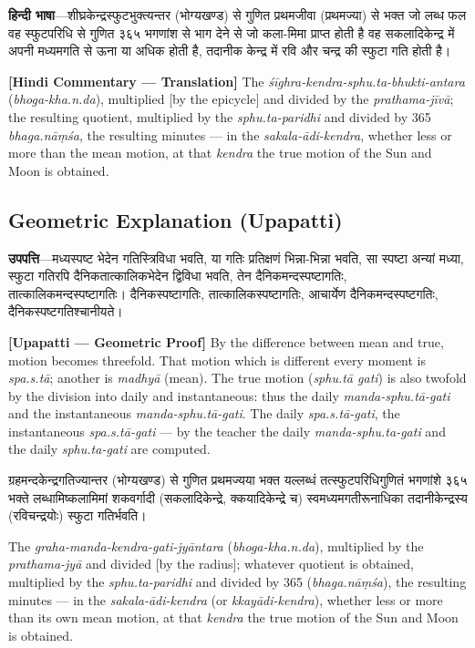 \documentclass[11pt,a4paper]{book}
\newcommand{\dev}[1]{{\devanagarifont #1}}
\newcommand{\hindicommbilingual}[2]{%
  \par\vspace{0.5em}%
  \noindent\begin{minipage}[t]{0.48\textwidth}
    \RaggedRight\small
    \dev{#1}
  \end{minipage}%
  \hfill
  \begin{minipage}[t]{0.48\textwidth}
    \RaggedRight\small
    #2%
  \end{minipage}%
  \par\vspace{0.5em}%
}
\begin{document}
\hindicommbilingual{%
\textbf{हिन्दी भाषा}---शीघ्रकेन्द्रस्फुटभुक्त्यन्तर (भोग्यखण्ड) से गुणित प्रथमजीवा (प्रथमज्या) से भक्त जो लब्ध फल वह स्फुटपरिधि से गुणित ३६५ भगणांश से भाग देने से जो कला-मिमा प्राप्त होती है वह सकलादिकेन्द्र में अपनी मध्यमगति से ऊना या अधिक होती है, तदानीक केन्द्र में रवि और चन्द्र की स्फुटा गति होती है।
}{%
\textbf{[Hindi Commentary --- Translation]} The \textit{śīghra-kendra-sphu.ta-bhukti-antara} (\textit{bhoga-kha.n.da}), multiplied [by the epicycle] and divided by the \textit{prathama-jīvā}; the resulting quotient, multiplied by the \textit{sphu.ta-paridhi} and divided by 365 \textit{bhaga.nāṃśa}, the resulting minutes --- in the \textit{sakala-ādi-kendra}, whether less or more than the mean motion, at that \textit{kendra} the true motion of the Sun and Moon is obtained.
}

\subsection*{Geometric Explanation (Upapatti)}

\hindicommbilingual{%
\textbf{उपपत्ति}---मध्यस्पष्ट भेदेन गतिस्त्रिविधा भवति, या गतिः प्रतिक्षणं भिन्ना-भिन्ना भवति, सा स्पष्टा अन्यां मध्या, स्फुटा गतिरपि दैनिकतात्कालिकभेदेन द्विविधा भवति, तेन दैनिकमन्दस्पष्टागतिः, तात्कालिकमन्दस्पष्टागतिः। दैनिकस्पष्टागतिः, तात्कालिकस्पष्टागतिः, आचार्येण दैनिकमन्दस्पष्टगतिः, दैनिकस्पष्टगतिश्चानीयते।
}{%
\textbf{[Upapatti --- Geometric Proof]} By the difference between mean and true, motion becomes threefold. That motion which is different every moment is \textit{spa.s.tā}; another is \textit{madhyā} (mean). The true motion (\textit{sphu.tā gati}) is also twofold by the division into daily and instantaneous: thus the daily \textit{manda-sphu.tā-gati} and the instantaneous \textit{manda-sphu.tā-gati}. The daily \textit{spa.s.tā-gati}, the instantaneous \textit{spa.s.tā-gati} --- by the teacher the daily \textit{manda-sphu.ta-gati} and the daily \textit{sphu.ta-gati} are computed.
}

\hindicommbilingual{%
ग्रहमन्दकेन्द्रगतिज्यान्तर (भोग्यखण्ड) से गुणित प्रथमज्यया भक्त यल्लब्धं तत्स्फुटपरिधिगुणितं भगणांशे ३६५ भक्ते लब्धामिष्कलामिमां शकवर्गादी (सकलादिकेन्द्रे, क्कयादिकेन्द्रे च) स्वमध्यमगतीरूनाधिका तदानीकेन्द्रस्य (रविचन्द्रयोः) स्फुटा गतिर्भवति।
}{%
The \textit{graha-manda-kendra-gati-jyāntara} (\textit{bhoga-kha.n.da}), multiplied by the \textit{prathama-jyā} and divided [by the radius]; whatever quotient is obtained, multiplied by the \textit{sphu.ta-paridhi} and divided by 365 (\textit{bhaga.nāṃśa}), the resulting minutes --- in the \textit{sakala-ādi-kendra} (or \textit{kkayādi-kendra}), whether less or more than its own mean motion, at that \textit{kendra} the true motion of the Sun and Moon is obtained.
}
\end{document}
